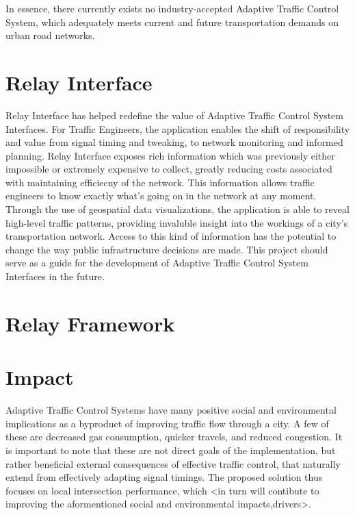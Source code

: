 \documentclass[a4paper,11pt]{report}
\begin{document}
\begin{multicols}{2}
In essence, there currently exists no industry-accepted Adaptive Traffic Control System, which adequately meets current and future transportation demands on urban road networks.

\section{Relay Interface}
Relay Interface has helped redefine the value of Adaptive Traffic Control System Interfaces. For Traffic Engineers, the application enables the shift of responsibility and value from signal timing and tweaking, to network monitoring and informed planning. Relay Interface exposes rich information which was previously either impossible or extremely expensive to collect, greatly reducing costs associated with maintaining efficiecny of the network. This information allows traffic engineers to know exactly what's going on in the network at any moment. Through the use of geospatial data visualizations, the application is able to reveal high-level traffic patterns, providing invaluble insight into the workings of a city's transportation network. Access to this kind of information has the potential to change the way public infrastructure decisions are made. This project should serve as a guide for the development of Adaptive Traffic Control System Interfaces in the future.

\section{Relay Framework}

\section{Impact}
Adaptive Traffic Control Systems have many positive social and environmental implications as a byproduct of improving traffic flow through a city.
A few of these are decreased gas consumption, quicker travels, and reduced congestion.
It is important to note that these are not direct goals of the implementation, but rather beneficial external consequences of effective traffic control, that naturally extend from effectively adapting signal timings.
The proposed solution thus focuses on local intersection performance, which <in turn will contibute to improving the aformentioned social and environmental impacts,drivers>.


\end{multicols}
\end{document}
